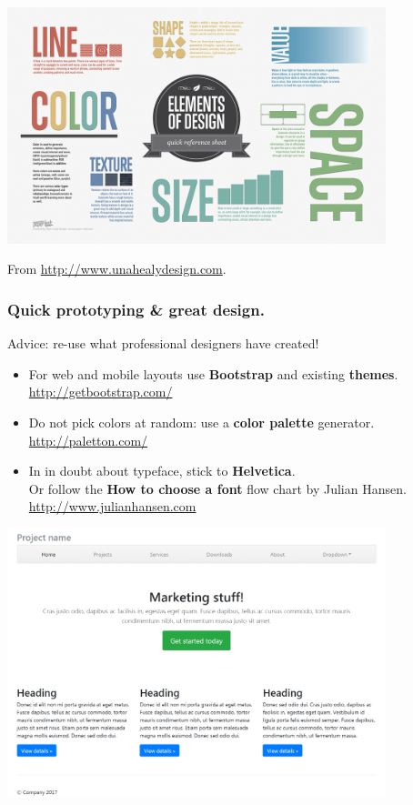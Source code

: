 \documentclass{beamer} %
\newcommand\emc[1]{\textcolor{brightblue}{\textbf{#1}}}
\begin{document}
\begin{frame}

\begin{center}
\includegraphics[width=11cm]{assets/Elements-of-Design2}
\end{center}

\tiny From \url{http://www.unahealydesign.com}.

\end{frame}

\begin{frame}

\frametitle{Quick prototyping \& great design.}

Advice: re-use what professional designers have created!
\begin{itemize}
  \item For web and mobile layouts use \emc{Bootstrap} and existing \emc{themes}.
  \url{http://getbootstrap.com/}
  \item Do not pick colors at random: use a \emc{color palette} generator.
  \url{http://paletton.com/}
  \item In in doubt about typeface, stick to \emc{Helvetica}. \\
  Or follow the \emc{How to choose a font} flow chart by Julian Hansen. 
  \url{http://www.julianhansen.com}
\end{itemize}

\end{frame}


\begin{frame}

\begin{center}
\includegraphics[width=11cm]{assets/bootstrap}
\end{center}

\end{frame}
\end{document}
